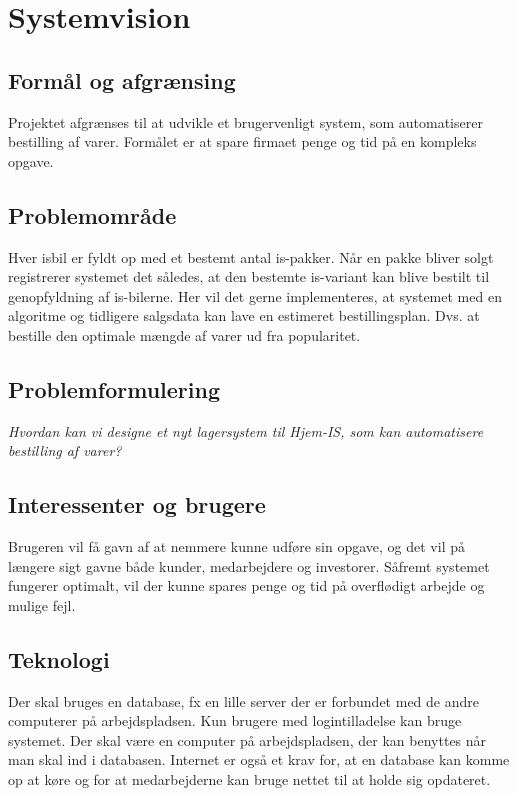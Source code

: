 \chapter{Systemvision}\label{ch:systemvision}

\section{Formål og afgrænsing}
Projektet afgrænses til at udvikle et brugervenligt system, som automatiserer bestilling af varer. 
Formålet er at spare firmaet penge og tid på en kompleks opgave.

\section{Problemområde}
Hver isbil er fyldt op med et bestemt antal is-pakker. Når en pakke bliver solgt registrerer systemet det således, at den bestemte is-variant kan blive bestilt til genopfyldning af is-bilerne. Her vil det gerne implementeres, at systemet med en algoritme og tidligere salgsdata kan lave en estimeret bestillingsplan. Dvs. at bestille den optimale mængde af varer ud fra popularitet. 

\section{Problemformulering}
\textit{Hvordan kan vi designe et nyt lagersystem til Hjem-IS, som kan automatisere bestilling af varer?}

\section{Interessenter og brugere}
Brugeren vil få gavn af at nemmere kunne udføre sin opgave, og det vil på længere sigt gavne både kunder, medarbejdere og investorer. Såfremt systemet fungerer optimalt, vil der kunne spares penge og tid på overflødigt arbejde og mulige fejl.

\section{Teknologi}
Der skal bruges en database, fx en lille server der er forbundet med de andre computerer på arbejdspladsen. Kun brugere med logintilladelse kan bruge systemet. Der skal være en computer på arbejdspladsen, der kan benyttes når man skal ind i databasen. Internet er også et krav for, at en database kan komme op at køre og for at medarbejderne kan bruge nettet til at holde sig opdateret.


